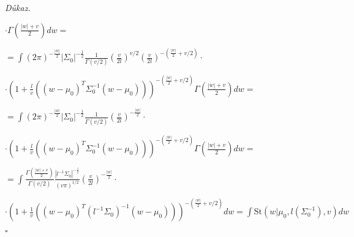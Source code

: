 \documentclass{article}
\newenvironment{pitemize}{
\begin{itemize}
  \setlength{\itemsep}{5pt}
  \setlength{\parskip}{0pt}
  \setlength{\parsep}{0pt}
}{\end{itemize}}
\newenvironment{pproof}{
\noindent\emph{Důkaz.}
\begin{pitemize}
}{\hfill$\square$\end{pitemize}}
\newcommand{\NN}{\mathcal{N}}
\newcommand{\NoG}{\mathcal{NG}}
\newcommand{\St}{\mathrm{St}}
\newcommand{\Gam}{\mathrm{Gam}}
\newtheorem{lemma}{Lemma}
\theoremstyle{definition}
\begin{document}
\begin{pproof}
$\cdot\Gamma\left(\frac{\left|w\right|+v}{2}\right) dw=$

$=\int(2\pi)^{-\frac{\left|w\right|}{2}}  \left|\Sigma_0\right|^{-\frac{1}{2}}
\frac{1}{\Gamma(v/2)} \left(\frac{v}{2l}\right)^{v/2}
\left(\frac{v}{2l}\right)^{-\left(\frac{\left|w\right|}{2}+v/2\right)}\cdot$
\nopagebreak

$\cdot\left(1+\frac{l}{v}\left(\left(w-\mu_0\right)^T \Sigma_0^{-1}\left(w- \mu_0\right)\right)\right)^{-\left(\frac{\left|w\right|}{2}+v/2\right)}\Gamma\left(\frac{\left|w\right|+v}{2}\right) dw=$

$=\int(2\pi)^{-\frac{\left|w\right|}{2}}  \left|\Sigma_0\right|^{-\frac{1}{2}}
\frac{1}{\Gamma(v/2)} 
\left(\frac{v}{2l}\right)^{-\frac{\left|w\right|}{2}}\cdot$
\nopagebreak

$\cdot\left(1+\frac{l}{v}\left(\left(w-\mu_0\right)^T \Sigma_0^{-1}\left(w- \mu_0\right)\right)\right)^{-\left(\frac{\left|w\right|}{2}+v/2\right)}\Gamma\left(\frac{\left|w\right|+v}{2}\right) dw=$

$=\int\frac{\Gamma\left(\frac{\left|w\right|+v}{2}\right)}{\Gamma(v/2)} 
\frac{ \left|l^{-1}\Sigma_0\right|^{-\frac{1}{2}}}{(v\pi)^{1/2}}
\left(\frac{v}{2l}\right)^{-\frac{\left|w\right|}{2}}\cdot$
\nopagebreak

$\cdot\left(1+\frac{1}{v}\left(\left(w-\mu_0\right)^T (l^{-1}\Sigma_0)^{-1}\left(w- \mu_0\right)\right)\right)^{-\left(\frac{\left|w\right|}{2}+v/2\right)} dw=\int\St\left(w|\mu_0,l\left(\Sigma_0^{-1}\right),v\right)dw$

\end{pproof}

\begin{comment}
\begin{lemma}[Marginál Normal-Gammy]
$$\int\NoG(w,\lambda|\mu_0,\Sigma_0,a,b) d \lambda = \St(x|\mu,???,???)$$
\end{lemma}
\begin{pproof}
\item $k=|w|$
\item $\int\NoG(w,\lambda|\mu_0,\Sigma,a,b) d \lambda = \int \NN(w|\mu_0,\lambda^{-1}\Sigma)\cdot\Gam(\lambda|a,b)dt =$

$= \int \left(2\pi\right)^{-\frac{k}{2}}|\lambda^{-1}\Sigma|^{-\frac{1}{2}}\exp\left(-\frac{1}{2}\left(\left(x-\mu\right)^T\lambda^{-1}
\Sigma\left(x-\mu
\right)\right)\right)
 \frac{1}{\Gamma(a)} b^a \lambda^{a-1}\exp(-b\lambda) dt=
$

$= \int \left(2\pi\right)^{-\frac{k}{2}}\lambda^{-k}|\Sigma|^{-\frac{1}{2}}\exp\left(-\frac{1}{2}\lambda^{-1}\left(\left(x-\mu\right)^T
\Sigma\left(x-\mu
\right)\right)\right)
 \frac{1}{\Gamma(a)} b^a \lambda^{a-1}\exp(-b\lambda) dt=
$

$= \left(2\pi\right)^{-\frac{k}{2}}\lambda^{-k}|\Sigma|^{-\frac{1}{2}} \frac{b^a}{\Gamma(a)} \int \exp\left(-\frac{1}{2}\lambda^{-1}\left(\left(x-\mu\right)^T
\Sigma\left(x-\mu
\right)\right)\right)
   \lambda^{a-1}\exp(-b\lambda) dt=
$

\end{pproof}

\end{comment}
\end{document}

